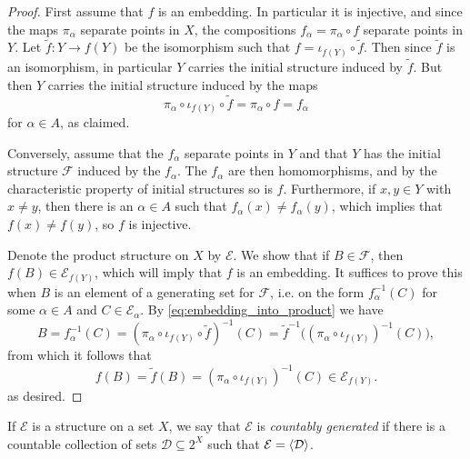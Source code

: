 \documentclass[article, a4paper, 11pt, oneside]{memoir}
\numberwithin{equation}{chapter}
\newcommand{\calE}{\mathcal{E}}
\newcommand{\calD}{\mathcal{D}}
\newcommand{\calF}{\mathcal{F}}
\DeclarePairedDelimiter{\gen}{\langle}{\rangle} %
\begin{document}
\begin{proof}
    First assume that $f$ is an embedding. In particular it is injective, and since the maps $\pi_\alpha$ separate points in $X$, the compositions $f_\alpha = \pi_\alpha \circ f$ separate points in $Y$. Let $\tilde f \colon Y \to f(Y)$ be the isomorphism such that $f = \iota_{f(Y)} \circ \tilde f$. Then since $\tilde f$ is an isomorphism, in particular $Y$ carries the initial structure induced by $\tilde f$. But then $Y$ carries the initial structure induced by the maps
    \begin{equation}
        \label{eq:embedding_into_product}
        \pi_\alpha \circ \iota_{f(Y)} \circ \tilde f
            = \pi_\alpha \circ f
            = f_\alpha
    \end{equation}
    for $\alpha \in A$, as claimed.

    Conversely, assume that the $f_\alpha$ separate points in $Y$ and that $Y$ has the initial structure $\calF$ induced by the $f_\alpha$. The $f_\alpha$ are then homomorphisms, and by the characteristic property of initial structures so is $f$. Furthermore, if $x,y \in Y$ with $x \neq y$, then there is an $\alpha \in A$ such that $f_\alpha(x) \neq f_\alpha(y)$, which implies that $f(x) \neq f(y)$, so $f$ is injective.

    Denote the product structure on $X$ by $\calE$. We show that if $B \in \calF$, then $f(B) \in \calE_{f(Y)}$, which will imply that $f$ is an embedding. It suffices to prove this when $B$ is an element of a generating set for $\calF$, i.e. on the form $f_\alpha^{-1}(C)$ for some $\alpha \in A$ and $C \in \calE_\alpha$. By \eqref{eq:embedding_into_product} we have
    \begin{equation*}
        B
            = f_\alpha^{-1}(C)
            = (\pi_\alpha \circ \iota_{f(Y)} \circ \tilde f)^{-1}(C)
            = \tilde f^{-1} \big( (\pi_\alpha \circ \iota_{f(Y)})^{-1}(C) \big),
    \end{equation*}
    from which it follows that
    \begin{equation*}
        f(B)
            = \tilde f(B)
            = (\pi_\alpha \circ \iota_{f(Y)})^{-1}(C)
            \in \calE_{f(Y)}.
    \end{equation*}
    as desired.
\end{proof}


If $\calE$ is a structure on a set $X$, we say that $\calE$ is \emph{countably generated} if there is a countable collection of sets $\calD \subseteq 2^X$ such that $\calE = \gen{\calD}$.
\end{document}

